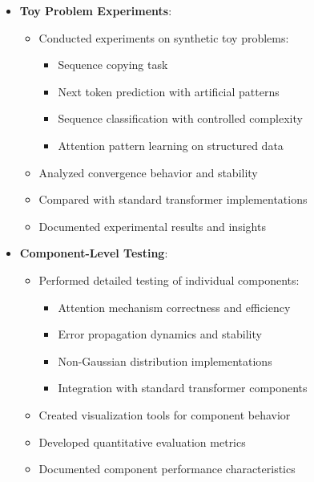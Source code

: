 \documentclass{article}
\begin{document}
\begin{itemize}
  \item \textbf{Toy Problem Experiments}:
  \begin{itemize}
    \item Conducted experiments on synthetic toy problems:
    \begin{itemize}
      \item Sequence copying task
      \item Next token prediction with artificial patterns
      \item Sequence classification with controlled complexity
      \item Attention pattern learning on structured data
    \end{itemize}
    \item Analyzed convergence behavior and stability
    \item Compared with standard transformer implementations
    \item Documented experimental results and insights
  \end{itemize}

  \item \textbf{Component-Level Testing}:
  \begin{itemize}
    \item Performed detailed testing of individual components:
    \begin{itemize}
      \item Attention mechanism correctness and efficiency
      \item Error propagation dynamics and stability
      \item Non-Gaussian distribution implementations
      \item Integration with standard transformer components
    \end{itemize}
    \item Created visualization tools for component behavior
    \item Developed quantitative evaluation metrics
    \item Documented component performance characteristics
  \end{itemize}


\end{itemize}
\end{document}

